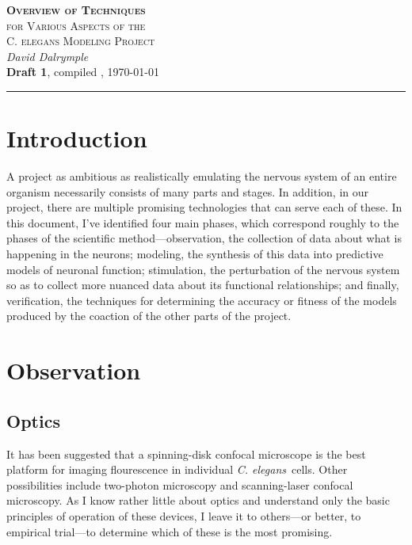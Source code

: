 \documentclass[letter,11pt]{article}
\newcommand{\cel}{{\em C. elegans}}
\begin{document}
\begin{center}
  \textsc{\LARGE \textbf{Overview of Techniques} \\[0.5mm] for Various Aspects of the \\[2.8mm] C. elegans Modeling Project}\\[3mm]
	\textit{\Large David Dalrymple}\\[2mm]
  {\large \textbf{Draft 1}, compiled \currenttime, \today\\[0mm]}
	\rule[2mm]{0.66\textwidth}{0.25mm}
\end{center}

\section*{Introduction}

A project as ambitious as realistically emulating the nervous system of an entire organism
necessarily consists of many parts and stages. In addition, in our project, there are
multiple promising technologies that can serve each of these. In this document, I've
identified four main phases, which correspond roughly to the phases of the scientific
method---observation, the collection of data about what is happening in the neurons;
modeling, the synthesis of this data into predictive models of neuronal function;
stimulation, the perturbation of the nervous system so as to collect more nuanced
data about its functional relationships; and finally, verification, the techniques
for determining the accuracy or fitness of the models produced by the coaction
of the other parts of the project.

\tableofcontents

\section{Observation}


\subsection{Optics}
\label{optics1}

It has been suggested that a spinning-disk confocal microscope is the best
platform for imaging flourescence in individual \cel\ cells.  Other
possibilities include two-photon microscopy and scanning-laser confocal
microscopy. As I know rather little about optics and understand only the basic
principles of operation of these devices, I leave it to others---or better, to
empirical trial---to determine which of these is the most promising.
\end{document}
